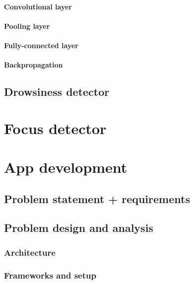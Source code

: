 \documentclass{article}
\begin{document}
        \paragraph{Convolutional layer}
        
        \paragraph{Pooling layer}
            
        \paragraph{Fully-connected layer}
            
        \paragraph{Backpropagation}
            
    \subsection{Drowsiness detector}
\newpage
\section{Focus detector}
    
\newpage
\section{App development}
    \subsection{Problem statement + requirements}
        
    \subsection{Problem design and analysis}
        \subsubsection{Architecture}
           
        \subsubsection{Frameworks and setup}
           
\end{document}
